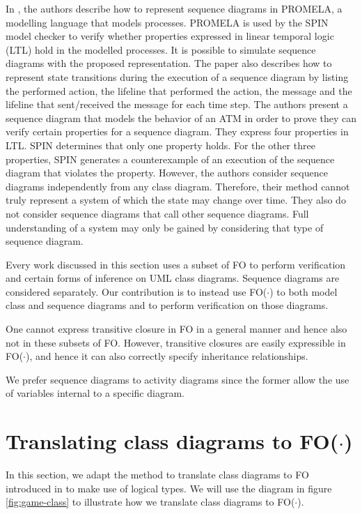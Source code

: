 \documentclass[conference]{IEEEtran}
\begin{document}
In \cite{LIMA2009143}, the authors describe how to represent sequence diagrams in PROMELA\cite{neumann2014using}, a modelling language that models processes. PROMELA is used by the SPIN\cite{holzmann2004spin} model checker to verify whether properties expressed in linear temporal logic (LTL) hold in the modelled processes. It is possible to simulate sequence diagrams with the proposed representation. The paper also describes how to represent state transitions during the execution of a sequence diagram by listing the performed action, the lifeline that performed the action, the message and the lifeline that sent/received the message for each time step. The authors present a sequence diagram that models the behavior of an ATM in order to prove they can verify certain properties for a sequence diagram. They express four properties in LTL. SPIN determines that only one property holds. For the other three properties, SPIN generates a counterexample of an execution of the sequence diagram that violates the property. However, the authors consider sequence diagrams independently from any class diagram. Therefore, their method cannot truly represent a system of which the state may change over time. They also do not consider sequence diagrams that call other sequence diagrams. Full understanding of a system may only be gained by considering that type of sequence diagram.

Every work discussed in this section uses a subset of FO to perform verification and certain forms of inference on UML class diagrams. Sequence diagrams are considered separately. Our contribution is to instead use FO($\cdot$) to both model class and sequence diagrams and to perform verification on those diagrams.

One cannot express transitive closure in FO in a general manner and hence also not in these subsets of FO. However, transitive closures are easily expressible in FO($\cdot$), and hence it can also correctly specify inheritance relationships. 

We prefer sequence diagrams to activity diagrams since the former allow the use of variables internal to a specific diagram.


\section{Translating class diagrams to FO($\cdot$)}\label{sec:class-diagram}

In this section, we adapt the method to translate class diagrams to FO introduced in \cite{BerardiDaniela2005RoUc} to make use of logical types. We will use the diagram in figure \ref{fig:game-class} to illustrate how we translate class diagrams to FO($\cdot$).
\end{document}
